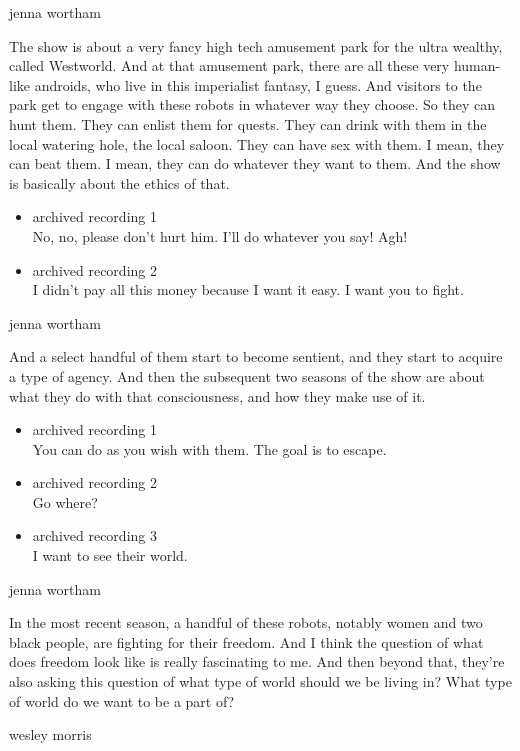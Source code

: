 jenna wortham

The show is about a very fancy high tech amusement park for the ultra
wealthy, called Westworld. And at that amusement park, there are all
these very human-like androids, who live in this imperialist fantasy, I
guess. And visitors to the park get to engage with these robots in
whatever way they choose. So they can hunt them. They can enlist them
for quests. They can drink with them in the local watering hole, the
local saloon. They can have sex with them. I mean, they can beat them. I
mean, they can do whatever they want to them. And the show is basically
about the ethics of that.

\begin{itemize}
\item
  archived recording 1\\
  No, no, please don't hurt him. I'll do whatever you say! Agh!
\item
  archived recording 2\\
  I didn't pay all this money because I want it easy. I want you to
  fight.
\end{itemize}

jenna wortham

And a select handful of them start to become sentient, and they start to
acquire a type of agency. And then the subsequent two seasons of the
show are about what they do with that consciousness, and how they make
use of it.

\begin{itemize}
\item
  archived recording 1\\
  You can do as you wish with them. The goal is to escape.
\item
  archived recording 2\\
  Go where?
\item
  archived recording 3\\
  I want to see their world.
\end{itemize}

jenna wortham

In the most recent season, a handful of these robots, notably women and
two black people, are fighting for their freedom. And I think the
question of what does freedom look like is really fascinating to me. And
then beyond that, they're also asking this question of what type of
world should we be living in? What type of world do we want to be a part
of?

wesley morris

